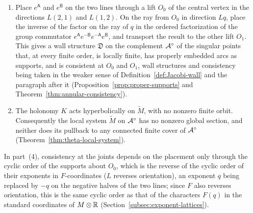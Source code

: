 \begin{maintheorem}
\begin{enumerate}
$dx\wedge dy$, so its Poisson bivector cannot serve in every chart
(Proposition~\ref{prop:no-scalar-frame}).  The volume form glues as a form
with values in a line bundle $\Lcal_\kappa$ over the covers obtained by
adjoining the roots of part~(2), and its Poisson bracket, transported along paths
from the frame of the sheet $S_0$, is a Jacobi bracket on $\Lcal_\kappa$ whose bivector
part, with respect to the transported local generators of $\Lcal_\kappa$, is
the bivector of $dx\wedge dy$ in the frame transported to every vertex of the path tree,
the tree of reduced sequences of crossings of the cuts that start in
$S_0$ (Proposition~\ref{prop:Jacobi-transport}).
\item Place $e^{\mathsf A}$ and $e^{\mathsf B}$ on the two lines through a lift $O_0$
of the central vertex in the directions $L(2,1)$ and $L(1,2)$.  On the ray
from $O_0$ in direction $Lq$, place the inverse of the factor on the ray of
$q$ in the ordered factorization of the group commutator
$e^{\mathsf A}e^{-\mathsf B}e^{-\mathsf A}e^{\mathsf B}$, and transport the
result to the other lift $O_1$.  This gives a wall structure $\mathfrak D$
on the complement $\mathcal A^\circ$ of the singular points that, at every finite
order, is locally finite, has properly embedded arcs as supports, and is
consistent at $O_0$ and $O_1$, wall structures and consistency being taken
in the weaker sense of Definition~\ref{def:Jacobi-wall} and the paragraph
after it (Proposition~\ref{prop:proper-supports} and
Theorem~\ref{thm:annular-consistency}).
\item The holonomy $K$ acts hyperbolically on $\widetilde M$, with no
nonzero finite orbit.  Consequently the local system $\widetilde M$ on
$\mathcal A^\circ$ has no nonzero global section, and neither does its pullback
to any connected finite cover of $\mathcal A^\circ$
(Theorem~\ref{thm:theta-local-system}).
\end{enumerate}
\end{maintheorem}

In part~(4), consistency at the joints depends on the placement only through
the cyclic order of the supports about $O_0$, which is the reverse of the
cyclic order of their exponents in $F$-coordinates ($L$ reverses
orientation), an exponent $q$ being replaced by $-q$ on the negative halves
of the two lines; since $F$ also reverses orientation, this is the same
cyclic order as that of the characters $F(q)$ in the standard coordinates of
$M\otimes\mathbb R$ (Section~\ref{subsec:exponent-lattices}).

